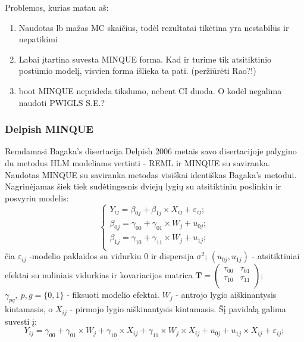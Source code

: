 \documentclass[12pt,a4paper]{article}
\begin{document}
Problemos, kurias matau aš:
\begin{enumerate}
\item Naudotas lb mažas MC skaičius, todėl rezultatai tikėtina yra nestabilūs ir nepatikimi
\item Labai įtartina suvesta MINQUE forma. Kad ir turime tik atsitiktinio postūmio modelį, visvien forma išlieka ta pati. (peržiūrėti Rao?!)
\item boot MINQUE neprideda tikslumo, nebent CI duoda. O kodėl negalima naudoti PWIGLS S.E.?
\end{enumerate}


\subsubsection{Delpish MINQUE}
\indent Remdamasi Bagaka's disertacija Delpish 2006 metais savo disertacijoje \cite{delpish} palygino du metodus HLM modeliams vertinti - REML ir MINQUE su saviranka. Naudotas MINQUE su saviranka metodas visiškai identiškas Bagaka's metodui. Nagrinėjamas šiek tiek sudėtingesnis dviejų lygių su atsitiktiniu poslinkiu ir posvyriu modelis:
\begin{equation} \label{eq:2lvldelpish}
\left\{
\begin{array}{l}
Y_{ij} = \beta_{0j}+ \beta_{1j}\times X_{ij}+\varepsilon_{ij}; \\
\beta_{0j} = \gamma_{00} +\gamma_{01}\times W_{j}+u_{0j};\\
\beta_{1j} = \gamma_{10} +\gamma_{11}\times W_{j}+u_{1j};\\
\end{array} \right.
\end{equation}
čia $\varepsilon_{ij}$ -modelio paklaidos su vidurkiu $0$ ir dispersija $\sigma^2$; $\left(u_{0j}, u_{1j}\right)$ - atsitiktiniai efektai su nuliniais vidurkias ir kovariacijos matrica $\mathbf{T}=\begin{pmatrix}
\tau_{00} & \tau_{01} \\
\tau_{10} & \tau_{11} \\
\end{pmatrix}$; $\gamma_{pq},\ p,g = \{0,1\}$ - fiksuoti modelio efektai. $W_j$ - antrojo lygio aiškinantysis kintamasis, o $X_{ij}$ - pirmojo lygio aiškinantysis kintamasis. Šį pavidalą galima suvesti į:
\begin{equation} \label{eq:deq}
Y_{ij} = \gamma_{00} +\gamma_{01}\times W_{j}+ \gamma_{10}\times X_{ij}+\gamma_{11}\times W_{j}\times X_{ij}+u_{0j}+u_{1j}\times X_{ij}+\varepsilon_{ij};
\end{equation}
\end{document}
